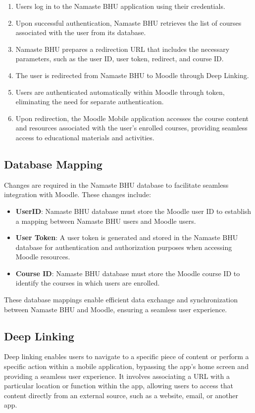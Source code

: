\begin{enumerate}
    \item Users log in to the Namaste BHU application using their credentials.
    \item Upon successful authentication, Namaste BHU retrieves the list of courses associated with the user from its database.
    \item Namaste BHU prepares a redirection URL that includes the necessary parameters, such as the user ID, user token, redirect, and course ID.
    \item The user is redirected from Namaste BHU to Moodle through Deep Linking.
    \item Users are authenticated automatically within Moodle through token, eliminating the need for separate authentication.
    \item Upon redirection, the Moodle Mobile application accesses the course content and resources associated with the user's enrolled courses, providing seamless access to educational materials and activities.
\end{enumerate}

\subsection{Database Mapping}

Changes are required in the Namaste BHU database to facilitate seamless integration with Moodle. These changes include:

\begin{itemize}
    \item \textbf{UserID}: Namaste BHU database must store the Moodle user ID to establish a mapping between Namaste BHU users and Moodle users.
    \item \textbf{User Token}: A user token is generated and stored in the Namaste BHU database for authentication and authorization purposes when accessing Moodle resources.
    \item \textbf{Course ID}: Namaste BHU database must store the Moodle course ID to identify the courses in which users are enrolled.
\end{itemize}

These database mappings enable efficient data exchange and synchronization between Namaste BHU and Moodle, ensuring a seamless user experience.\\

\subsection{Deep Linking}
Deep linking enables users to navigate to a specific piece of content or perform a specific action within a mobile application, bypassing the app's home screen and providing a seamless user experience. It involves associating a URL with a particular location or function within the app, allowing users to access that content directly from an external source, such as a website, email, or another app.

